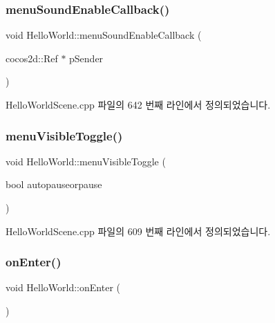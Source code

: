 \subsubsection{\texorpdfstring{menu\+Sound\+Enable\+Callback()}{menuSoundEnableCallback()}}
{\footnotesize\ttfamily void Hello\+World\+::menu\+Sound\+Enable\+Callback (\begin{DoxyParamCaption}\item[{cocos2d\+::\+Ref $\ast$}]{p\+Sender }\end{DoxyParamCaption})}



Hello\+World\+Scene.\+cpp 파일의 642 번째 라인에서 정의되었습니다.

\mbox{\label{class_hello_world_a38047ef68d46872dd39be5d4cc59ad18}} 
\subsubsection{\texorpdfstring{menu\+Visible\+Toggle()}{menuVisibleToggle()}}
{\footnotesize\ttfamily void Hello\+World\+::menu\+Visible\+Toggle (\begin{DoxyParamCaption}\item[{bool}]{autopauseorpause }\end{DoxyParamCaption})\hspace{0.3cm}{\ttfamily [protected]}}



Hello\+World\+Scene.\+cpp 파일의 609 번째 라인에서 정의되었습니다.

\mbox{\label{class_hello_world_a0e47c5b1692f5ba74b776be85422dc75}} 
\subsubsection{\texorpdfstring{on\+Enter()}{onEnter()}}
{\footnotesize\ttfamily void Hello\+World\+::on\+Enter (\begin{DoxyParamCaption}{ }\end{DoxyParamCaption})\hspace{0.3cm}{\ttfamily [virtual]}}



